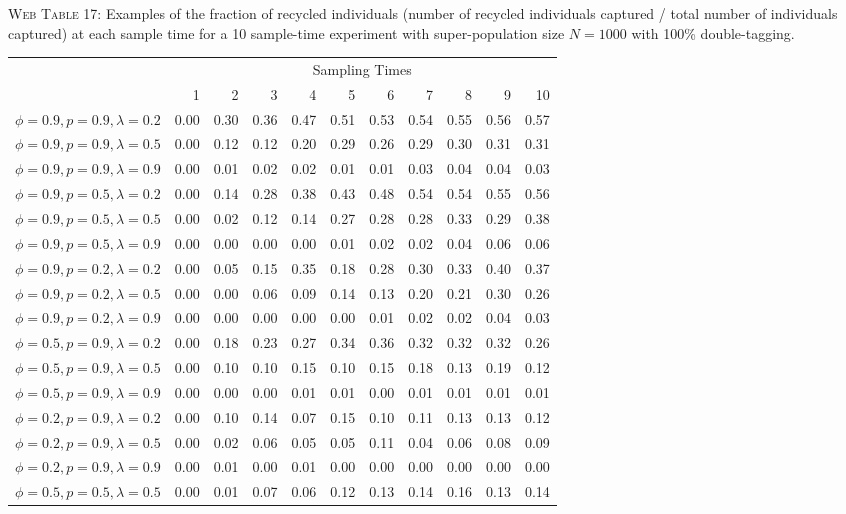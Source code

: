 \documentclass[]{article}
\begin{document}
\textsc{Web Table 17:} Examples of the fraction of recycled individuals
(number of recycled individuals captured / total number of individuals
captured) at each sample time for a 10 sample-time experiment with
super-population size \(N=1000\) with 100\% double-tagging.

\begin{table}[ht]
\begin{tabular}{rrrrrrrrrrr}
  \hline
& \multicolumn{10}{c}{Sampling Times}\\
 & 1 & 2 & 3 & 4 & 5 & 6 & 7 & 8 & 9 & 10 \\ 
  \hline
  $\phi=0.9, p=0.9, \lambda=0.2$ & 0.00 & 0.30 & 0.36 & 0.47 & 0.51 & 0.53 & 0.54 & 0.55 & 0.56 & 0.57 \\ 
  $\phi=0.9, p=0.9, \lambda=0.5$ & 0.00 & 0.12 & 0.12 & 0.20 & 0.29 & 0.26 & 0.29 & 0.30 & 0.31 & 0.31 \\ 
  $\phi=0.9, p=0.9, \lambda=0.9$ & 0.00 & 0.01 & 0.02 & 0.02 & 0.01 & 0.01 & 0.03 & 0.04 & 0.04 & 0.03 \\ \hline
  $\phi=0.9, p=0.5, \lambda=0.2$ & 0.00 & 0.14 & 0.28 & 0.38 & 0.43 & 0.48 & 0.54 & 0.54 & 0.55 & 0.56 \\ 
  $\phi=0.9, p=0.5, \lambda=0.5$ & 0.00 & 0.02 & 0.12 & 0.14 & 0.27 & 0.28 & 0.28 & 0.33 & 0.29 & 0.38 \\ 
  $\phi=0.9, p=0.5, \lambda=0.9$ & 0.00 & 0.00 & 0.00 & 0.00 & 0.01 & 0.02 & 0.02 & 0.04 & 0.06 & 0.06 \\ \hline
  $\phi=0.9, p=0.2, \lambda=0.2$ & 0.00 & 0.05 & 0.15 & 0.35 & 0.18 & 0.28 & 0.30 & 0.33 & 0.40 & 0.37 \\ 
  $\phi=0.9, p=0.2, \lambda=0.5$ & 0.00 & 0.00 & 0.06 & 0.09 & 0.14 & 0.13 & 0.20 & 0.21 & 0.30 & 0.26 \\ 
  $\phi=0.9, p=0.2, \lambda=0.9$ & 0.00 & 0.00 & 0.00 & 0.00 & 0.00 & 0.01 & 0.02 & 0.02 & 0.04 & 0.03 \\ \hline
  $\phi=0.5, p=0.9, \lambda=0.2$ & 0.00 & 0.18 & 0.23 & 0.27 & 0.34 & 0.36 & 0.32 & 0.32 & 0.32 & 0.26 \\ 
  $\phi=0.5, p=0.9, \lambda=0.5$ & 0.00 & 0.10 & 0.10 & 0.15 & 0.10 & 0.15 & 0.18 & 0.13 & 0.19 & 0.12 \\ 
  $\phi=0.5, p=0.9, \lambda=0.9$ & 0.00 & 0.00 & 0.00 & 0.01 & 0.01 & 0.00 & 0.01 & 0.01 & 0.01 & 0.01 \\ \hline
  $\phi=0.2, p=0.9, \lambda=0.2$ & 0.00 & 0.10 & 0.14 & 0.07 & 0.15 & 0.10 & 0.11 & 0.13 & 0.13 & 0.12 \\ 
  $\phi=0.2, p=0.9, \lambda=0.5$ & 0.00 & 0.02 & 0.06 & 0.05 & 0.05 & 0.11 & 0.04 & 0.06 & 0.08 & 0.09 \\ 
  $\phi=0.2, p=0.9, \lambda=0.9$ & 0.00 & 0.01 & 0.00 & 0.01 & 0.00 & 0.00 & 0.00 & 0.00 & 0.00 & 0.00 \\ \hline
    $\phi=0.5, p=0.5, \lambda=0.5$ & 0.00 & 0.01 & 0.07 & 0.06 & 0.12 & 0.13 & 0.14 & 0.16 & 0.13 & 0.14 \\ \hline
\end{tabular}
\end{table}
\end{document}
